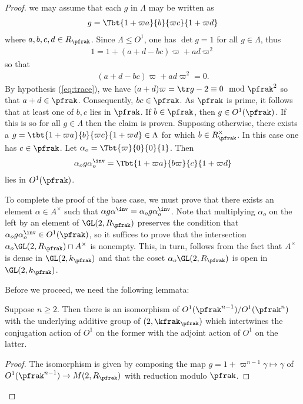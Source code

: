 \begin{proof}
    we may assume that each $g$ in $\Lambda$ may be written as
    \begin{align*}
        g = \Tbt{1+\varpi a}{b}{\varpi c}{1+\varpi d}
    \end{align*}
    where $a,b,c,d \in R_\pfrak$.
    Since $\Lambda \leq O^1$, one has $\det g = 1 $ for all $g\in \Lambda$, thus
    \begin{align*}
        1 = 1 + (a+d - bc) \varpi + ad \varpi^2
    \end{align*}
    so that
    \begin{align}\label{eq:MandarinLeyden}
        (a+d - bc) \varpi + ad \varpi^2 =0.
    \end{align}
    By hypothesis (\ref{eq:trace}), we have $(a+d)\varpi = \tr g -2 \equiv 0 \mod \pfrak^2$ so that $a+d \in \pfrak$. Consequently, $bc \in \pfrak$. As $\pfrak$ is prime, it follows that at least one of $b,c$ lies in $\pfrak$. If $b \in \pfrak$, then $g \in O^1(\pfrak)$. If this is so for all $g \in \Lambda$ then the claim is proven. Supposing otherwise, there exists a $g=\tbt{1+\varpi a}{b}{\varpi c}{1+\varpi d} \in \Lambda$ for which $b \in R_\pfrak^\times$. In this case one has $c \in \pfrak$. Let $\alpha_o = \Tbt{\varpi}{0}{0}{1}$. Then
    \begin{align*}
        \alpha_o g\alpha_o^\inv  = \Tbt{1+\varpi a}{b\varpi}{c}{1+\varpi d}
    \end{align*}
    lies in $O^1(\pfrak)$.

    To complete the proof of the base case, we must prove that there exists an element $\alpha \in A^\times $ such that $\alpha g \alpha^\inv =  \alpha_o g \alpha_o^\inv$. Note that multiplying $\alpha_o$ on the left by an element of $\GL(2,R_\pfrak)$ preserves the condition that $\alpha_o g \alpha_o^\inv \in O^1(\pfrak)$, so it suffices to prove that the intersection $\alpha_o \GL(2,R_\pfrak) \cap A^\times $ is nonempty. This, in turn, follows from the fact that $A^\times$ is dense in $\GL(2,k_\pfrak)$ and that the coset  $\alpha_o \GL(2,R_\pfrak)$ is open in $\GL(2,k_\pfrak)$.

    Before we proceed, we need the following lemmata:
    \begin{lemma}\label{lemma:iso}
        Suppose $n\geq 2$. Then there is an isomorphism of $O^1(\pfrak^{n-1}) / O^1(\pfrak^{n})$ with the underlying additive group of $\sl(2,\kfrak_\pfrak)$ which intertwines the conjugation action of $O^1$ on the former with the adjoint action of $O^1$ on the latter.
    \end{lemma}
    \begin{proof}
        The isomorphism is given by composing the map $g = 1 + \varpi^{n-1}\gamma \mapsto \gamma$  of $O^1(\pfrak^{n-1}) \to M(2,R_\pfrak)$ with reduction modulo $\pfrak$.
    \end{proof}


\end{proof}
